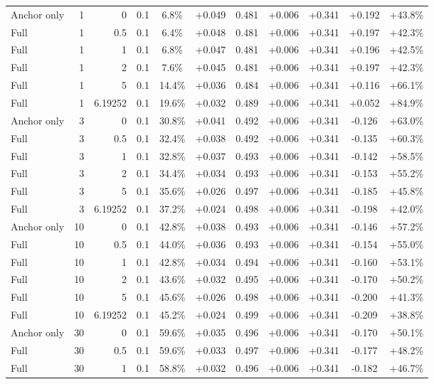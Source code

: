 \begin{table}[htbp]
\begin{tabular}{lrrrccccccc}
Anchor only & 1 & 0 & 0.1 & 6.8\% & +0.049 & 0.481 & +0.006 & +0.341 & +0.192 & +43.8\% \\
Full & 1 & 0.5 & 0.1 & 6.4\% & +0.048 & 0.481 & +0.006 & +0.341 & +0.197 & +42.3\% \\
Full & 1 & 1 & 0.1 & 6.8\% & +0.047 & 0.481 & +0.006 & +0.341 & +0.196 & +42.5\% \\
Full & 1 & 2 & 0.1 & 7.6\% & +0.045 & 0.481 & +0.006 & +0.341 & +0.197 & +42.3\% \\
Full & 1 & 5 & 0.1 & 14.4\% & +0.036 & 0.484 & +0.006 & +0.341 & +0.116 & +66.1\% \\
Full & 1 & 6.19252 & 0.1 & 19.6\% & +0.032 & 0.489 & +0.006 & +0.341 & +0.052 & +84.9\% \\
Anchor only & 3 & 0 & 0.1 & 30.8\% & +0.041 & 0.492 & +0.006 & +0.341 & -0.126 & +63.0\% \\
Full & 3 & 0.5 & 0.1 & 32.4\% & +0.038 & 0.492 & +0.006 & +0.341 & -0.135 & +60.3\% \\
Full & 3 & 1 & 0.1 & 32.8\% & +0.037 & 0.493 & +0.006 & +0.341 & -0.142 & +58.5\% \\
Full & 3 & 2 & 0.1 & 34.4\% & +0.034 & 0.493 & +0.006 & +0.341 & -0.153 & +55.2\% \\
Full & 3 & 5 & 0.1 & 35.6\% & +0.026 & 0.497 & +0.006 & +0.341 & -0.185 & +45.8\% \\
Full & 3 & 6.19252 & 0.1 & 37.2\% & +0.024 & 0.498 & +0.006 & +0.341 & -0.198 & +42.0\% \\
Anchor only & 10 & 0 & 0.1 & 42.8\% & +0.038 & 0.493 & +0.006 & +0.341 & -0.146 & +57.2\% \\
Full & 10 & 0.5 & 0.1 & 44.0\% & +0.036 & 0.493 & +0.006 & +0.341 & -0.154 & +55.0\% \\
Full & 10 & 1 & 0.1 & 42.8\% & +0.034 & 0.494 & +0.006 & +0.341 & -0.160 & +53.1\% \\
Full & 10 & 2 & 0.1 & 43.6\% & +0.032 & 0.495 & +0.006 & +0.341 & -0.170 & +50.2\% \\
Full & 10 & 5 & 0.1 & 45.6\% & +0.026 & 0.498 & +0.006 & +0.341 & -0.200 & +41.3\% \\
Full & 10 & 6.19252 & 0.1 & 45.2\% & +0.024 & 0.499 & +0.006 & +0.341 & -0.209 & +38.8\% \\
Anchor only & 30 & 0 & 0.1 & 59.6\% & +0.035 & 0.496 & +0.006 & +0.341 & -0.170 & +50.1\% \\
Full & 30 & 0.5 & 0.1 & 59.6\% & +0.033 & 0.497 & +0.006 & +0.341 & -0.177 & +48.2\% \\
Full & 30 & 1 & 0.1 & 58.8\% & +0.032 & 0.496 & +0.006 & +0.341 & -0.182 & +46.7\% \\

\end{tabular}
\end{table}
